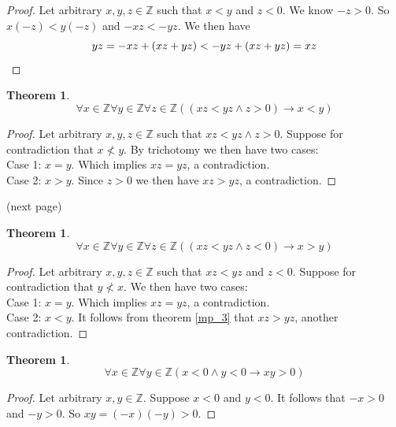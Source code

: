 \documentclass{report}
\newtheorem{theorem}[theo]{Theorem}
\begin{document}
\begin{proof}
Let arbitrary $x,y,z\in\mathbb Z$ such that $x<y$ and $z<0$. We know $-z>0$. So $x(-z)<y(-z)$ and
$-xz<-yz$. We then have
\begin{equation*}
yz=-xz+(xz+yz)<-yz+(xz+yz)=xz\qedhere
\end{equation*}
\end{proof}
\begin{theorem}\label{mp_4}
\begin{equation*}
\forall x\in\mathbb Z\forall y\in\mathbb Z\forall z\in\mathbb Z((xz<yz\land z>0)\to x<y)
\end{equation*}
\end{theorem}
\begin{proof}
Let arbitrary $x,y,z\in\mathbb Z$ such that $xz<yz\land z>0$. Suppose for contradiction that $x\nless y$. By trichotomy we then have two cases:\\
\indent Case 1: $x=y$. Which implies $xz=yz$, a contradiction.\\
\indent Case 2: $x>y$. Since $z>0$ we then have $xz>yz$, a contradiction.
\end{proof}
\noindent(next page)
\newpage
\begin{theorem}
\begin{equation*}\label{mp_5}
\forall x\in\mathbb Z\forall y\in\mathbb Z\forall z\in\mathbb Z((xz<yz\land z<0)\to x>y)
\end{equation*}
\end{theorem}
\begin{proof}
Let arbitrary $x,y,z\in\mathbb Z$ such that $xz<yz$ and $z<0$. Suppose for contradiction that $y\nless x$. We then have two cases:\\
\indent Case 1: $x=y$. Which implies $xz=yz$, a contradiction.\\
\indent Case 2: $x<y$. It follows from theorem \ref{mp_3} that $xz>yz$, another contradiction.\qedhere
\end{proof}
\begin{theorem}\label{mp_6}
\begin{equation*}
\forall x\in\mathbb Z\forall y\in\mathbb Z(x<0\land y<0\to xy>0)
\end{equation*}
\end{theorem}
\begin{proof}
Let arbitrary $x,y\in\mathbb Z$. Suppose $x<0$ and $y<0$. It follows that $-x>0$ and $-y>0$.
So $xy=(-x)(-y)>0$.
\end{proof}
\newpage
\end{document}
